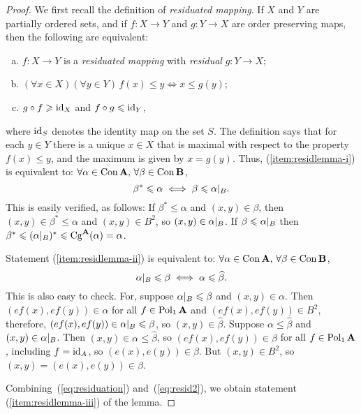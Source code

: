 \begin{proof}
  We first recall the definition of {\it residuated mapping}.  If $X$ and $Y$
  are partially ordered sets, and if
$f\colon  X \rightarrow Y$ and
$g\colon  Y \rightarrow X$ are order preserving maps, then the following are
equivalent:
\begin{enumerate}[(a)]
\item $f\colon  X \rightarrow Y$ is a {\it residuated mapping} with {\it residual}
$g\colon  Y \rightarrow X$;
\item 
$(\forall  x\in X)(\forall y\in Y) \, f(x) \leq y \iff x \leq g(y)$;
\item $g\circ f \geqslant \operatorname{id}_X$ and $f\circ g \leqslant \operatorname{id}_Y$,
\end{enumerate}
where $\operatorname{id}_S$ denotes the identity map on the set $S$.
The definition says that for each $y\in Y$ there is a unique
$x\in X$ that is maximal with respect to the property $f(x) \leq y$, and the
maximum is given by $x = g(y)$.
Thus, (\ref{item:residlemma-i}) is equivalent to:
$\forall  \alpha \in \operatorname{Con}\mathbf{A},\, \forall  \beta \in \operatorname{Con}\mathbf{B}$,
\begin{equation}
  \label{eq:residuation}
\beta^* \leqslant \alpha \iff \beta \leqslant \alpha|_B.
\end{equation}
This is easily verified, as follows:  If
$\beta^* \leq \alpha$ and $(x,y)\in \beta$, then
$(x,y) \in \beta^* \leq \alpha$
and $(x,y) \in B^2$, so $(x,y)\in
\alpha|_B$.  If $\beta \leqslant \alpha|_B$ then
$\beta^* \leqslant (\alpha|_B)^* \leqslant \operatorname{Cg}^{\mathbf{A}}(\alpha) = \alpha$.

Statement (\ref{item:residlemma-ii}) is equivalent to:
$\forall \alpha \in \operatorname{Con}\mathbf{A}, \, \forall \beta \in \operatorname{Con}\mathbf{B}$,
\begin{equation}
  \label{eq:resid2}
\alpha|_B\leqslant \beta \iff \alpha \leqslant \widehat{\beta}.
\end{equation}
This is also easy to check.  For, suppose
$\alpha|_B\leqslant \beta$ and $(x,y)\in \alpha$. Then $(ef(x), ef(y)) \in \alpha$
for all $f \in \operatorname{Pol}_1\mathbf{A}$ and $(ef(x), ef(y)) \in B^2$, therefore,
$(ef(x), ef(y)) \in \alpha|_B \leqslant \beta$, so $(x,y) \in \widehat{\beta}$.
Suppose $\alpha \leq \widehat{\beta}$ and $(x,y) \in \alpha|_B$.
Then $(x,y) \in \alpha \leq  \widehat{\beta}$, so
$(ef(x), ef(y)) \in \beta$ for all $f\in \operatorname{Pol}_1\mathbf{A}$, including $f=\operatorname{id}_A$, so
$(e(x), e(y)) \in \beta$. But $(x, y) \in B^2$, so $(x, y) = (e(x), e(y)) \in
\beta$.

Combining~(\ref{eq:residuation}) and~(\ref{eq:resid2}), we obtain statement (\ref{item:residlemma-iii}) of the lemma.
\end{proof}


